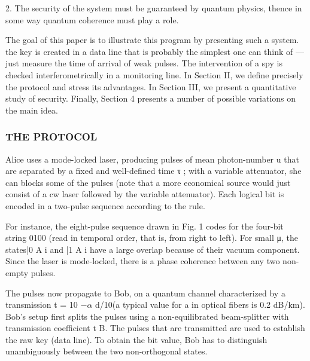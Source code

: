 2. The security of the system must be guaranteed by quantum physics, thence in some way quantum coherence must play a role.

The goal of this paper is to illustrate this program by presenting such a system. the key is created in a data line that is probably the simplest one can think of —just measure the time of arrival of weak pulses. The intervention of a spy is checked interferometrically in a monitoring line. In Section II, we define precisely the protocol and stress its advantages. In Section III, we present a quantitative study of security. Finally, Section 4 presents a number of possible variations on the main idea.


\subsubsection{THE PROTOCOL}

Alice uses a mode-locked laser, producing pulses of mean photon-number u that are separated by a fixed and well-defined time τ ; with a variable attenuator, she can blocks some of the pulses (note that a more economical source would just consist of a cw laser followed by the variable attenuator). Each logical bit is encoded in a two-pulse sequence according to the rule.

For instance, the eight-pulse sequence drawn in Fig. 1 codes for the four-bit string 0100 (read in temporal order, that is, from right to left). For small μ, the states|0 A i and |1 A i have a large overlap because of their vacuum component. Since the laser is mode-locked, there is a phase coherence between any two non-empty pulses.

The pulses now propagate to Bob, on a quantum channel characterized by a transmission t = 10 −$\alpha$ d/10(a typical value for a in optical fibers is 0.2 dB/km).
Bob’s setup first splits the pulses using a non-equilibrated beam-splitter with transmission coefficient t B. The pulses that are transmitted are used to establish the raw key (data line). To obtain the bit value, Bob has to distinguish unambiguously between the two non-orthogonal states.

